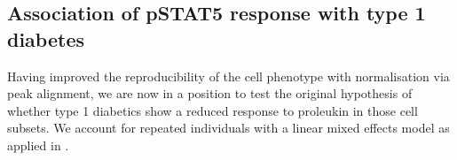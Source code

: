 
\subsection{Association of pSTAT5 response with type 1 diabetes}

Having improved the reproducibility of the cell phenotype with normalisation via peak alignment, we are now in a position to test
the original hypothesis of whether type 1 diabetics show a reduced response to proleukin in those cell subsets.
We account for repeated individuals with a linear mixed effects model as applied in .

